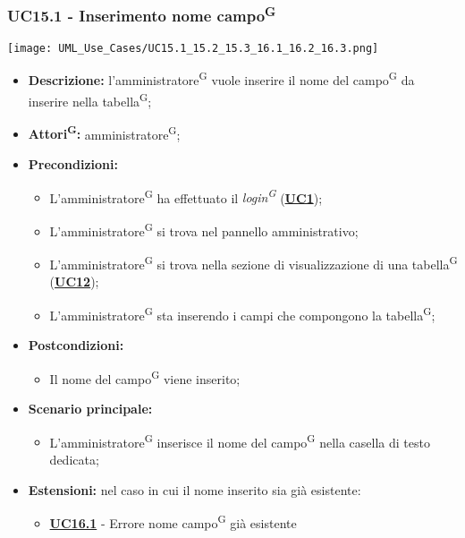 \subsubsection{UC15.1 - Inserimento nome campo\textsuperscript{G}}
\label{sec:UC15.1}
\texttt{[image: UML\_Use\_Cases/UC15.1\_15.2\_15.3\_16.1\_16.2\_16.3.png]}
\begin{itemize}
	\item \textbf{Descrizione:} l’amministratore\textsuperscript{G} vuole inserire il nome del campo\textsuperscript{G} da inserire nella tabella\textsuperscript{G};
	\item \textbf{Attori\textsuperscript{G}:} amministratore\textsuperscript{G};
	\item \textbf{Precondizioni:} 
	\begin{itemize}
		\item L’amministratore\textsuperscript{G} ha effettuato il \textit{login\textsuperscript{G}} (\hyperref[sec:UC1]{\textbf{UC1}});
		\item L’amministratore\textsuperscript{G} si trova nel pannello amministrativo;
		\item L’amministratore\textsuperscript{G} si trova nella sezione di visualizzazione di una tabella\textsuperscript{G} (\hyperref[sec:UC12]{\textbf{UC12}});
		\item L’amministratore\textsuperscript{G} sta inserendo i campi che compongono la tabella\textsuperscript{G};
	\end{itemize}
	\item \textbf{Postcondizioni:} 
	\begin{itemize}
		\item Il nome del campo\textsuperscript{G} viene inserito;
	\end{itemize}
	\item \textbf{Scenario principale:} 
	\begin{itemize}
		\item L’amministratore\textsuperscript{G} inserisce il nome del campo\textsuperscript{G} nella casella di testo dedicata;
	\end{itemize}
	\item \textbf{Estensioni:} nel caso in cui il nome inserito sia già esistente:
	\begin{itemize}
		\item \hyperref[sec:UC16.1]{\textbf{UC16.1}} - Errore nome campo\textsuperscript{G} già esistente
	\end{itemize}
\end{itemize}

